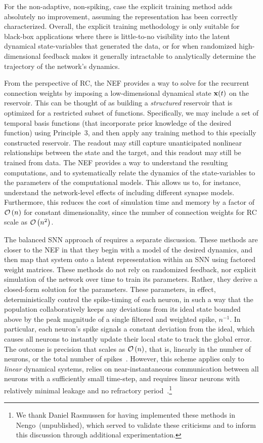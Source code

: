 For the non-adaptive, non-spiking, case the explicit training method adds absolutely no improvement, assuming the representation has been correctly characterized.
Overall, the explicit training methodology is only suitable for black-box applications where there is little-to-no visibility into the latent dynamical state-variables that generated the data, or for when randomized high-dimensional feedback makes it generally intractable to analytically determine the trajectory of the network's dynamics.

From the perspective of RC, the NEF provides a way to solve for the recurrent connection weights by imposing a low-dimensional dynamical state $\mathbf{x}(t)$ on the reservoir.
This can be thought of as building a  \emph{structured} reservoir that is optimized for a restricted subset of functions.
Specifically, we may include a set of temporal basis functions (that incorporate prior knowledge of the desired function) using Principle~3, and then apply any training method to this specially constructed reservoir.
The readout may still capture unanticipated nonlinear relationships between the state and the target, and this readout may still be trained from data.
The NEF provides a way to understand the resulting computations, and to systematically relate the dynamics of the state-variables to the parameters of the computational models.
This allows us to, for instance, understand the network-level effects of including different synapse models.
Furthermore, this reduces the cost of simulation time and memory by a factor of $\mathcal{O}\left({ n }\right)$ for constant dimensionality, since the number of connection weights for RC scale as $\mathcal{O}\left({ n^2 }\right)$.

The balanced SNN approach of \citet{boerlin2011spike, boerlin2013predictive} requires a separate discussion.
These methods are closer to the NEF in that they begin with a model of the desired dynamics, and then map that system onto a latent representation within an SNN using factored weight matrices.
These methods do not rely on randomized feedback, nor explicit simulation of the network over time to train its parameters.
Rather, they derive a closed-form solution for the parameters.
These parameters, in effect, deterministically control the spike-timing of each neuron, in such a way that the population collaboratively keeps any deviations from its ideal state bounded above by the peak magnitude of a single filtered and weighted spike, $n^{-1}$.
In particular, each neuron's spike signals a constant deviation from the ideal, which causes all neurons to instantly update their local state to track the global error.
The outcome is precision that scales as $\mathcal{O}\left({n}\right)$, that is, linearly in the number of neurons, or the total number of spikes~\citep{boahen2017neuromorph}. 
However, this scheme applies only to \emph{linear} dynamical systems, relies on near-instantaneous communication between all neurons with a sufficiently small time-step, and requires linear neurons with relatively minimal leakage and no refractory period~\citep{boerlin2013predictive}.\footnote{
We thank Daniel Rasmussen for having implemented these methods in Nengo~(unpublished),
which served to validate these criticisms and to inform this discussion through additional experimentation.}

